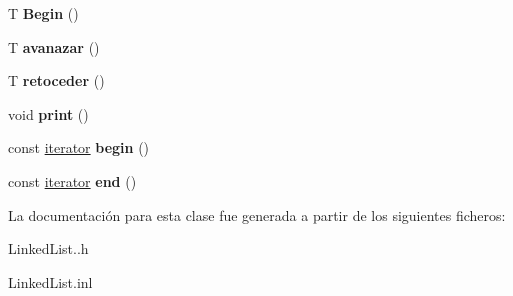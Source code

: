 \begin{DoxyCompactItemize}
T {\bfseries Begin} ()
\item 
\mbox{\label{classlinked__list_aadca380f53b303b62509bfce959f33d6}} 
T {\bfseries avanazar} ()
\item 
\mbox{\label{classlinked__list_a47097df0301afd838e1f8cce1f0c5ef7}} 
T {\bfseries retoceder} ()
\item 
\mbox{\label{classlinked__list_a8ac8990c73a2578bea0a7497fa4fa032}} 
void {\bfseries print} ()
\item 
\mbox{\label{classlinked__list_a71e36e07530d5ecfa693e413af2cd4f3}} 
const \hyperlink{classlinked__list_1_1iterator}{iterator} {\bfseries begin} ()
\item 
\mbox{\label{classlinked__list_a171281add059178d1d8026d9c891bc43}} 
const \hyperlink{classlinked__list_1_1iterator}{iterator} {\bfseries end} ()
\end{DoxyCompactItemize}


La documentación para esta clase fue generada a partir de los siguientes ficheros\+:\begin{DoxyCompactItemize}
\item 
Linked\+List..\+h\item 
Linked\+List.\+inl\end{DoxyCompactItemize}
